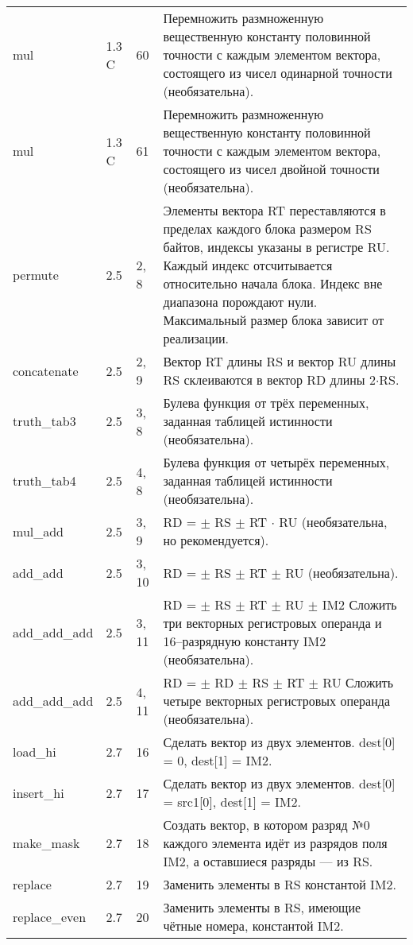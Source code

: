 \documentclass[forwardcom.tex]{subfiles}
\begin{document}
\begin{longtable}{|p{25mm}|p{16mm}|p{9mm}|p{99mm}|}
mul              & 1.3 C & 60 & Перемножить размноженную вещественную константу половинной точности с каждым элементом вектора, состоящего из чисел одинарной точности (необязательна). \\
mul              & 1.3 C & 61 & Перемножить размноженную вещественную константу половинной точности с каждым элементом вектора, состоящего из чисел двойной точности (необязательна). \\
permute          & 2.5   & 2, 8 & Элементы вектора RT переставляются в пределах каждого блока размером RS байтов, индексы указаны в регистре RU. Каждый индекс отсчитывается относительно начала блока. Индекс вне диапазона порождают нули. Максимальный размер блока зависит от реализации. \\
concatenate      & 2.5 & 2, 9 & Вектор RT длины RS и вектор RU длины RS склеиваются в вектор  RD длины 2$\cdot$RS. \\
truth\_tab3      & 2.5 & 3, 8 & Булева функция от трёх переменных, заданная таблицей истинности (необязательна). \\
truth\_tab4      & 2.5 & 4, 8 & Булева функция от четырёх переменных, заданная таблицей истинности (необязательна).  \\
mul\_add         & 2.5 & 3, 9 & RD = $\pm$ RS $\pm$ RT $\cdot$ RU (необязательна, но рекомендуется). \\
add\_add         & 2.5 & 3, 10 & RD = $\pm$ RS $\pm$ RT $\pm$ RU (необязательна). \\
add\_add\_add    & 2.5 & 3, 11 & RD = $\pm$ RS $\pm$ RT $\pm$ RU $\pm$ IM2  Сложить три векторных регистровых операнда и 16--разрядную константу IM2 (необязательна). \\
add\_add\_add    & 2.5 & 4, 11 & RD = $\pm$ RD $\pm$ RS $\pm$ RT $\pm$ RU Сложить четыре векторных регистровых операнда (необязательна). \\
load\_hi         & 2.7 & 16 & Сделать вектор из двух элементов. dest[0] = 0, dest[1] = IM2. \\
insert\_hi       & 2.7 & 17 & Сделать вектор из двух элементов. dest[0] = src1[0], dest[1] = IM2. \\
make\_mask       & 2.7 & 18 & Создать вектор, в котором разряд №0 каждого элемента идёт из разрядов поля IM2, а оставшиеся разряды --- из RS. \\
replace          & 2.7 & 19 & Заменить элементы в RS константой IM2. \\
replace\_even    & 2.7 & 20 & Заменить элементы в RS, имеющие чётные номера, константой IM2.\\

\end{longtable}
\end{document}
